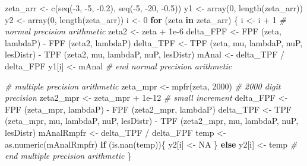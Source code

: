 \documentclass[
]{book}
\newenvironment{Shaded}{\begin{snugshade}}{\end{snugshade}}
\newcommand{\CommentTok}[1]{\textcolor[rgb]{0.56,0.35,0.01}{\textit{#1}}}
\newcommand{\ConstantTok}[1]{\textcolor[rgb]{0.00,0.00,0.00}{#1}}
\newcommand{\ControlFlowTok}[1]{\textcolor[rgb]{0.13,0.29,0.53}{\textbf{#1}}}
\newcommand{\DecValTok}[1]{\textcolor[rgb]{0.00,0.00,0.81}{#1}}
\newcommand{\FloatTok}[1]{\textcolor[rgb]{0.00,0.00,0.81}{#1}}
\newcommand{\FunctionTok}[1]{\textcolor[rgb]{0.00,0.00,0.00}{#1}}
\newcommand{\NormalTok}[1]{#1}
\newcommand{\OtherTok}[1]{\textcolor[rgb]{0.56,0.35,0.01}{#1}}
\newcommand{\SpecialCharTok}[1]{\textcolor[rgb]{0.00,0.00,0.00}{#1}}
\begin{document}
\begin{Shaded}
\begin{Highlighting}[]
\NormalTok{zeta\_arr }\OtherTok{\textless{}{-}} \FunctionTok{c}\NormalTok{(}\FunctionTok{seq}\NormalTok{(}\SpecialCharTok{{-}}\DecValTok{3}\NormalTok{, }\SpecialCharTok{{-}}\DecValTok{5}\NormalTok{, }\SpecialCharTok{{-}}\FloatTok{0.2}\NormalTok{), }\FunctionTok{seq}\NormalTok{(}\SpecialCharTok{{-}}\DecValTok{5}\NormalTok{, }\SpecialCharTok{{-}}\DecValTok{20}\NormalTok{, }\SpecialCharTok{{-}}\FloatTok{0.5}\NormalTok{))}
\NormalTok{y1 }\OtherTok{\textless{}{-}} \FunctionTok{array}\NormalTok{(}\DecValTok{0}\NormalTok{, }\FunctionTok{length}\NormalTok{(zeta\_arr))}
\NormalTok{y2 }\OtherTok{\textless{}{-}} \FunctionTok{array}\NormalTok{(}\DecValTok{0}\NormalTok{, }\FunctionTok{length}\NormalTok{(zeta\_arr))}
\NormalTok{i }\OtherTok{\textless{}{-}} \DecValTok{0}
\ControlFlowTok{for}\NormalTok{ (zeta }\ControlFlowTok{in}\NormalTok{ zeta\_arr) \{}
\NormalTok{  i }\OtherTok{\textless{}{-}}\NormalTok{ i }\SpecialCharTok{+} \DecValTok{1}
  \CommentTok{\# normal precision arithmetic}
\NormalTok{  zeta2 }\OtherTok{\textless{}{-}}\NormalTok{ zeta }\SpecialCharTok{+} \FloatTok{1e{-}6}
\NormalTok{  delta\_FPF }\OtherTok{\textless{}{-}} \FunctionTok{FPF}\NormalTok{ (zeta, lambdaP) }\SpecialCharTok{{-}} \FunctionTok{FPF}\NormalTok{ (zeta2, lambdaP)}
\NormalTok{  delta\_TPF }\OtherTok{\textless{}{-}} \FunctionTok{TPF}\NormalTok{ (zeta, mu, lambdaP, nuP, lesDistr) }\SpecialCharTok{{-}} 
    \FunctionTok{TPF}\NormalTok{ (zeta2, mu, lambdaP, nuP, lesDistr)}
\NormalTok{  mAnal }\OtherTok{\textless{}{-}}\NormalTok{ delta\_TPF }\SpecialCharTok{/}\NormalTok{ delta\_FPF}
\NormalTok{  y1[i] }\OtherTok{\textless{}{-}}\NormalTok{ mAnal}
  \CommentTok{\# end normal precision arithmetic}
  
  \CommentTok{\# multiple precision arithmetic}
\NormalTok{  zeta\_mpr }\OtherTok{\textless{}{-}} \FunctionTok{mpfr}\NormalTok{(zeta, }\DecValTok{2000}\NormalTok{) }\CommentTok{\# 2000 digit precision}
\NormalTok{  zeta2\_mpr }\OtherTok{\textless{}{-}}\NormalTok{ zeta\_mpr }\SpecialCharTok{+} \FloatTok{1e{-}12} \CommentTok{\# small increment}
\NormalTok{  delta\_FPF }\OtherTok{\textless{}{-}} \FunctionTok{FPF}\NormalTok{ (zeta\_mpr, lambdaP) }\SpecialCharTok{{-}} \FunctionTok{FPF}\NormalTok{ (zeta2\_mpr, lambdaP)}
\NormalTok{  delta\_TPF }\OtherTok{\textless{}{-}} \FunctionTok{TPF}\NormalTok{ (zeta\_mpr, mu, lambdaP, nuP, lesDistr) }\SpecialCharTok{{-}} 
    \FunctionTok{TPF}\NormalTok{ (zeta2\_mpr, mu, lambdaP, nuP, lesDistr)}
\NormalTok{  mAnalRmpfr }\OtherTok{\textless{}{-}}\NormalTok{ delta\_TPF }\SpecialCharTok{/}\NormalTok{ delta\_FPF}
\NormalTok{  temp }\OtherTok{\textless{}{-}} \FunctionTok{as.numeric}\NormalTok{(mAnalRmpfr)}
  \ControlFlowTok{if}\NormalTok{ (}\FunctionTok{is.nan}\NormalTok{(temp))\{}
\NormalTok{    y2[i] }\OtherTok{\textless{}{-}} \ConstantTok{NA}
\NormalTok{  \} }\ControlFlowTok{else}\NormalTok{ y2[i] }\OtherTok{\textless{}{-}}\NormalTok{ temp }
  \CommentTok{\# end multiple precision arithmetic}
\NormalTok{\}}
\end{Highlighting}
\end{Shaded}
\end{document}
